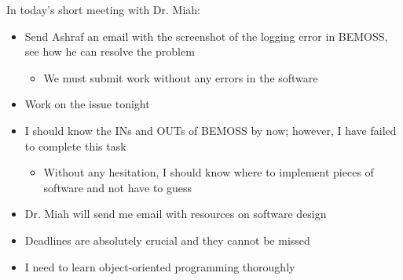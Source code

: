 \documentclass[fontsize=11pt, %
                             paper=letter, %
                             twoside, %
                             captions=tableheading,
                             index=totoc,
                             hyperref]{labbook}
\begin{document}
\begin{addmargin}[0cm]{0cm}
In today's short meeting with Dr. Miah:
\begin{itemize}
\item Send Ashraf an email with the screenshot of the logging error in BEMOSS, see how he can resolve the problem
\begin{itemize}
\item We must submit work without any errors in the software
\end{itemize}
\item Work on the issue tonight
\item I should know the INs and OUTs of BEMOSS by now; however, I have failed to complete this task
\begin{itemize}
\item Without any hesitation, I should know where to implement pieces of software and not have to guess
\end{itemize}
\item Dr. Miah will send me email with resources on software design
\item Deadlines are absolutely crucial and they cannot be missed
\item I need to learn object-oriented programming thoroughly
\end{itemize}
\end{addmargin}










\end{document}
